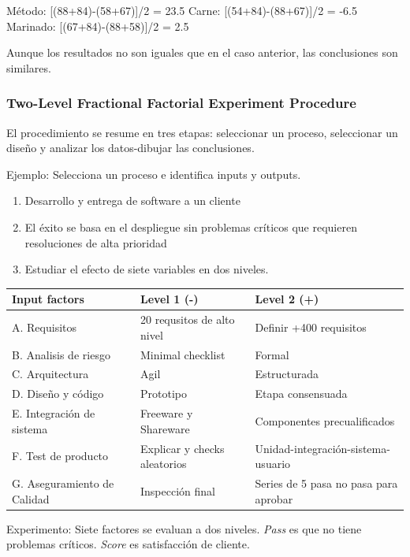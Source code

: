 \documentclass[]{article}
\begin{document}
Método: [(88+84)-(58+67)]/2 = 23.5
Carne: [(54+84)-(88+67)]/2 = -6.5
Marinado: [(67+84)-(88+58)]/2 = 2.5

Aunque los resultados no son iguales que en el caso anterior, las conclusiones son similares.

\subsubsection{Two-Level Fractional Factorial Experiment Procedure}

El procedimiento se resume en tres etapas: seleccionar un proceso, seleccionar un diseño y analizar los datos-dibujar las conclusiones.

Ejemplo:
Selecciona un proceso e identifica inputs y outputs.
\begin{enumerate}
	\item Desarrollo y entrega de software a un cliente
	\item El éxito se basa en el despliegue sin problemas críticos que requieren resoluciones de alta prioridad
	\item Estudiar el efecto de siete variables en dos niveles.
\end{enumerate}

\begin{table}[H]
	\begin{center}
\begin{tabular}{|p{5cm}|p{5cm}|p{5cm}|}
	\hline Input factors & Level 1 (-) & Level 2 (+) \\
	\hline A. Requisitos & 20 requsitos de alto nivel & Definir +400 requisitos \\
	\hline B. Analisis de riesgo & Minimal checklist & Formal \\
	\hline C. Arquitectura & Agil & Estructurada \\
	\hline D. Diseño y código & Prototipo & Etapa consensuada \\
	\hline E. Integración de sistema & Freeware y Shareware & Componentes precualificados \\
	\hline F. Test de producto & Explicar y checks aleatorios & Unidad-integración-sistema-usuario \\
	\hline G. Aseguramiento de Calidad & Inspección final & Series de 5 pasa no pasa para aprobar \\
	\hline
\end{tabular}
\end{center}
\end{table}
Experimento: Siete factores se evaluan a dos niveles. \textit{Pass} es que no tiene problemas críticos. \textit{Score} es satisfacción de cliente.
\end{document}

